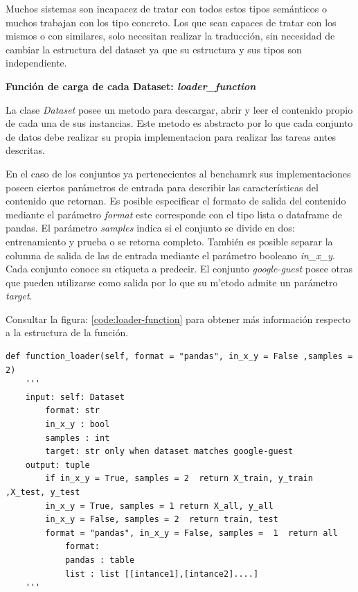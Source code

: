 Muchos sistemas son incapacez de tratar con todos estos tipos semánticos o muchos trabajan con los tipo concreto.
Los que sean capaces de tratar con los mismos o con similares, solo necesitan realizar la traducción, sin necesidad de cambiar
la estructura del dataset ya que su estructura y sus tipos son independiente.

\begin{flushleft} 
    { \textbf{Función de carga de cada Dataset: \textit{loader\_function}}}\label{class:loader-function}
\end{flushleft}
La clase \textit{Dataset} posee un metodo para descargar, abrir y leer el contenido propio de cada una de sus instancias.
Este metodo es abstracto por lo que cada conjunto de datos debe realizar su propia implementacion para realizar las tareas antes descritas. 

En el caso de los conjuntos ya pertenecientes al benchamrk sus implementaciones poseen ciertos parámetros de entrada para describir las características del 
contenido que retornan. Es posible especificar el formato de salida del contenido mediante el parámetro \textit{format} este corresponde con el tipo lista o 
dataframe de pandas. 
El parámetro \textit{samples} indica si el conjunto se divide en dos: entrenamiento y prueba o se retorna completo. 
También es posible separar la columna de salida de las de entrada mediante el parámetro booleano \textit{in\_x\_y}. 
Cada conjunto conoce su etiqueta a predecir. El conjunto \textit{google-guest} posee otras que pueden utilizarse como salida por lo que su m'etodo admite un 
parámetro \textit{target}.  

Consultar la figura: \ref{code:loader-function} para obtener más información respecto a la estructura de la función. 

\begin{lstlisting}[caption=Estructura de las fuciones de carga de los dataset, label = code:loader-function]
def function_loader(self, format = "pandas", in_x_y = False ,samples =  2)
    '''
    input: self: Dataset
        format: str
        in_x_y : bool
        samples : int
        target: str only when dataset matches google-guest
    output: tuple	   
        if in_x_y = True, samples = 2  return X_train, y_train ,X_test, y_test
        in_x_y = True, samples = 1 return X_all, y_all
        in_x_y = False, samples = 2  return train, test
        format = "pandas", in_x_y = False, samples =  1  return all
            format:
            pandas : table 
            list : list [[intance1],[intance2]....]
    '''
    \end{lstlisting}


